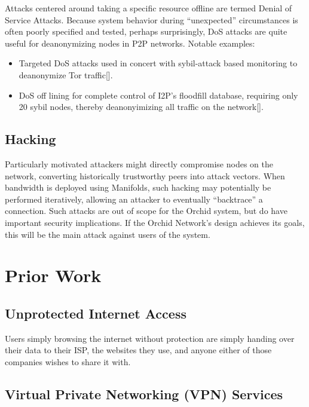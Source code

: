 \documentclass{article}
\newcommand{\mesh}{Orchid}
\begin{document}
Attacks centered around taking a specific resource offline are termed Denial of Service Attacks. Because system behavior during “unexpected” circumstances is often poorly specified and tested, perhaps surprisingly, DoS attacks are quite useful for deanonymizing nodes in P2P networks. Notable examples:

\begin{itemize}
\item Targeted DoS attacks used in concert with sybil-attack based monitoring to deanonymize Tor traffic[\cite{DOSvsSec}].
\item DoS off lining for complete control of I2P’s floodfill database, requiring only 20 sybil nodes, thereby deanonyimizing all traffic on the network[\cite{I2P-vigna}].
\end{itemize}

\subsection{Hacking}

Particularly motivated attackers might directly compromise nodes on the network, converting historically trustworthy peers into attack vectors. When bandwidth is deployed using Manifolds, such hacking may potentially be performed iteratively, allowing an attacker to eventually ``backtrace'' a connection. Such attacks are out of scope for the \mesh{} system, but do have important security implications. If the \mesh{} Network's design achieves its goals, this will be the main attack against users of the system.


\section{Prior Work}
\label{sec:prior-work}

\subsection{Unprotected Internet Access}

Users simply browsing the internet without protection are simply handing over their data to their ISP, the websites they use, and anyone either of those companies wishes to share it with.

\subsection{Virtual Private Networking (VPN) Services}
\end{document}
